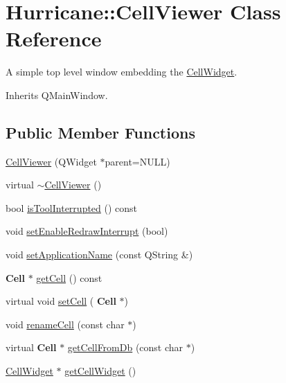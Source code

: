 \hypertarget{classHurricane_1_1CellViewer}{}\section{Hurricane\+:\+:Cell\+Viewer Class Reference}
\label{classHurricane_1_1CellViewer}


A simple top level window embedding the \hyperlink{classHurricane_1_1CellWidget}{Cell\+Widget}.  




Inherits Q\+Main\+Window.

\subsection*{Public Member Functions}
\begin{DoxyCompactItemize}
\item 
\hyperlink{classHurricane_1_1CellViewer_a94abd334392f43bf92548ee1153be5e1}{Cell\+Viewer} (Q\+Widget $\ast$parent=N\+U\+LL)
\item 
virtual \hyperlink{classHurricane_1_1CellViewer_ad2573bba4536bbf2b074d98f21711fe8}{$\sim$\+Cell\+Viewer} ()
\item 
bool \hyperlink{classHurricane_1_1CellViewer_ab869899320b57cb86d8080593d385eaf}{is\+Tool\+Interrupted} () const
\item 
void \hyperlink{classHurricane_1_1CellViewer_a356453d6430cc64c794e49404a8657b0}{set\+Enable\+Redraw\+Interrupt} (bool)
\item 
void \hyperlink{classHurricane_1_1CellViewer_a961c789cdae39edad13f171da05f7930}{set\+Application\+Name} (const Q\+String \&)
\item 
\textbf{ Cell} $\ast$ \hyperlink{classHurricane_1_1CellViewer_af45f807c9d7728a2ecf3184e731e53e0}{get\+Cell} () const
\item 
virtual void \hyperlink{classHurricane_1_1CellViewer_a5d4707b5e364b8a3a36857103bdac45d}{set\+Cell} (\textbf{ Cell} $\ast$)
\item 
void \hyperlink{classHurricane_1_1CellViewer_ae5d3d8c58dee944d99375650c3166587}{rename\+Cell} (const char $\ast$)
\item 
virtual \textbf{ Cell} $\ast$ \hyperlink{classHurricane_1_1CellViewer_a0ea301f7e85f936c38b5cd59e3752309}{get\+Cell\+From\+Db} (const char $\ast$)
\item 
\hyperlink{classHurricane_1_1CellWidget}{Cell\+Widget} $\ast$ \hyperlink{classHurricane_1_1CellViewer_a1d57547e30b1fb51aec2d0f254be6d3e}{get\+Cell\+Widget} ()

\end{DoxyCompactItemize}
